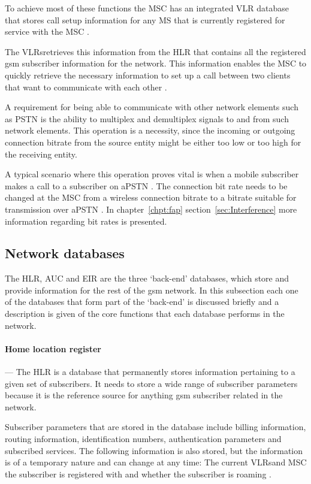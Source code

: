 To achieve most of these functions the \gls{MSC} has an integrated \gls{VLR} database that stores call setup information for any \gls{MS} that is currently registered for service with the \gls{MSC} \cite{GSM92,wirelesstelcoMullet}. 

The \glspl{VLR}retrieves this information from the \gls{HLR} that contains all the registered \gls{gsm} subscriber information for the network. This information enables the \gls{MSC} to quickly retrieve the necessary information to set up a call between two clients that want to communicate with each other \cite{GSMSysEngin,GSMSecurInTeleNetwork}.

A requirement for being able to communicate with other network elements such as \gls{PSTN} is the ability to multiplex and demultiplex signals to and from such network elements. This operation is a necessity, since the incoming or outgoing connection bitrate from the source entity might be either too low or too high for the receiving entity.

A typical scenario where this operation proves vital is when a mobile subscriber makes a call to a subscriber on a\gls{PSTN} \@. The connection bit rate needs to be changed at the \gls{MSC} from a wireless connection bitrate to a bitrate suitable for transmission over a\gls{PSTN} \@. In chapter~\ref{chpt:fap} section~\ref{sec:Interference} more information regarding bit rates is presented.

\subsection{Network databases}
The \gls{HLR},  \gls{AUC} and \gls{EIR} are the three `back-end' databases, which store and provide information for the rest of the \gls{gsm} network. In this subsection each one of the databases that form part of the `back-end' is discussed briefly and a description is given of the core functions that each database performs in the network.

\paragraph{Home location register}
--- The \gls{HLR} is a database that permanently stores information pertaining to a given set of subscribers. It needs to store a wide range of subscriber parameters because it is the reference source for anything \gls{gsm} subscriber related in the network\cite{GSMSysEngin}. 

Subscriber parameters that are stored in the database include billing information, routing information, identification numbers, authentication parameters and subscribed services\cite{GSMSysEngin}. The following information is also stored, but the information is of a temporary nature and can change at any time: The current \glspl{VLR}and \gls{MSC} the subscriber is registered with and whether the subscriber is roaming \cite{GSMSysEngin}.

